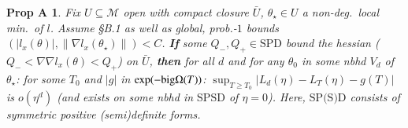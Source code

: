 \documentclass{article}
\newcommand{\Mm}{\mathcal{M}}
\newtheorem*{propA*}{{Prop A}}
\begin{document}
        \begin{propA*}\vspace{-0.25cm}
            Fix $U\subseteq \Mm$ open with compact closure $\bar{U}$, 
            $\theta_\star\in U$ a non-deg.\ local min.\ of $l$.
            Assume \S{B.1} as well as global, prob.-$1$ bounds $(|l_x(\theta)|,\|\nabla
            l_x(\theta_\star)\|)<C$.
            \textbf{If} some $Q_-,Q_+\in \text{SPD}$ bound the hessian
            ($Q_- < \nabla\nabla l_x(\theta)<Q_+$) on $\bar{U}$,
            \textbf{then} for all $d$ and for any $\theta_0$ in
            some nbhd $V_d$ of $\theta_\star$: for some $T_0$ and
            $|g|$ in $\exp(-{\rm big}\Omega(T))$:
            $\sup_{T\geq T_0} |L_d(\eta)-L_T(\eta)-g(T)|$ is
            $o(\eta^d)$
            (and exists on some nbhd in $\text{SPSD}$ of
            $\eta=0$).  Here, $\text{SP(S)D}$ consists of symmetric positive
            (semi)definite forms.
        \end{propA*}

\end{document}
